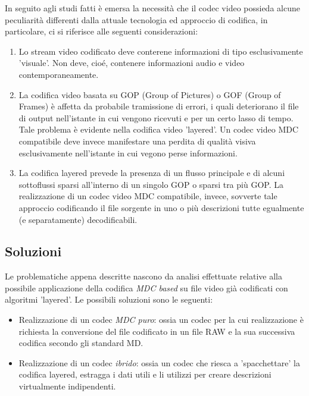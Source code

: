 In seguito agli studi fatti è emersa la necessità che il codec video possieda
alcune peculiarità differenti dalla attuale tecnologia ed approccio di codifica, in
particolare, ci si riferisce alle seguenti considerazioni:

\begin{enumerate}
\item Lo stream video codificato deve conterene informazioni di tipo
esclusivamente 'visuale'. Non deve, cioé, contenere informazioni audio e video
contemporaneamente.

\item La codifica video basata su GOP (Group of Pictures) o GOF (Group of
Frames) è affetta da probabile tramissione di errori, i quali deteriorano il
file di output nell'istante in cui vengono ricevuti e per un certo lasso di
tempo. Tale problema è evidente nella codifica video 'layered'. Un codec video
MDC compatibile deve invece manifestare una perdita di qualità visiva
esclusivamente nell'istante in cui vegono perse informazioni.

\item La codifica layered prevede la presenza di un flusso principale e di
alcuni sottoflussi sparsi all'interno di un singolo GOP o sparsi tra più GOP.
La realizzazione di un codec video MDC compatibile, invece, sovverte tale
approccio codificando il file sorgente in uno o più descrizioni tutte egualmente
(e separatamente) decodificabili.
\end{enumerate}

\subsection{Soluzioni}

Le problematiche appena descritte nascono da analisi effettuate relative alla
possibile applicazione della codifica \emph{MDC based} su file video già
codificati con algoritmi 'layered'. Le possibili soluzioni sono le seguenti:

\begin{itemize}
  \item Realizzazione di un codec \emph{MDC puro}: ossia un codec per la cui
  realizzazione è richiesta la conversione del file codificato in un file RAW e
  la sua successiva codifica secondo gli standard MD.
  \item Realizzazione di un codec \emph{ibrido}: ossia un codec che riesca a
  'spacchettare' la codifica layered, estragga i dati utili e li utilizzi per
  creare descrizioni virtualmente indipendenti.
\end{itemize}

